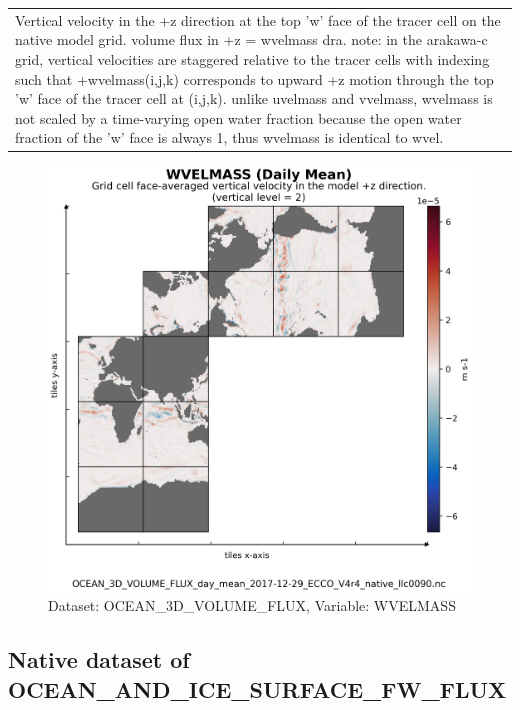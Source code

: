 \begin{longtable}{|m{}|m{}|m{}|m{}|}
\rowcolor{lightgray} \multicolumn{4}{|c|}{\textbf{Comments}} \\ \hline
\multicolumn{4}{|p{1\textwidth}|}{\footnotesize{{Vertical velocity in the +z direction at the top 'w' face of the tracer cell on the native model grid. volume flux in +z = wvelmass dra. note: in the arakawa-c grid, vertical velocities are staggered relative to the tracer cells with indexing such that +wvelmass(i,j,k) corresponds to upward +z motion through the top 'w' face of the tracer cell at (i,j,k). unlike uvelmass and vvelmass, wvelmass is not scaled by a time-varying open water fraction because the open water fraction of the 'w' face is always 1, thus wvelmass is identical to wvel.}}} \\ \hline
\end{longtable}

\begin{figure}[H]
\centering
\includegraphics[scale=0.55]{../images/plots/v4r4/native_plots/Ocean_Three-Dimensional_Volume_Fluxes/WVELMASS.png}
\caption{Dataset: OCEAN\_3D\_VOLUME\_FLUX, Variable: WVELMASS}
\label{tab:table-OCEAN_3D_VOLUME_FLUX_WVELMASS-Plot}
\end{figure}
\newpage
\subsection{Native dataset of OCEAN\_AND\_ICE\_SURFACE\_FW\_FLUX}
\newp
